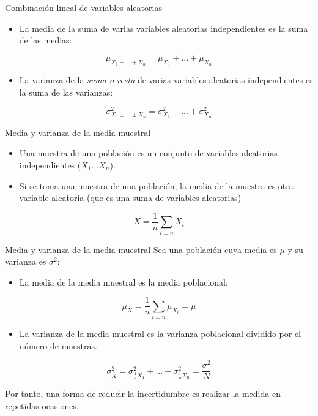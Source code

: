 \documentclass[aspectratio=169, usenames,svgnames,dvipsnames]{beamer}
\begin{document}
\begin{frame}[label={sec:org675d2d7}]{Combinación lineal de variables aleatorias}
\begin{itemize}
\item La \alert{media de la suma} de varias variables aleatorias \alert{independientes} es
la suma de las medias:
\end{itemize}
\[
\mu_{X_{1}+...+X_{n}}=\mu_{X_{1}}+...+\mu_{X_{n}}
\]

\begin{itemize}
\item La \alert{varianza de la \emph{suma o resta}} de varias variables aleatorias
\alert{independientes} es la \alert{suma} de las varianzas:
\end{itemize}

\[
\sigma_{X_{1}\pm...\pm X_{n}}^{2}=\sigma_{X_{1}}^{2}+...+\sigma_{X_{n}}^{2}
\]
\end{frame}



\begin{frame}[label={sec:orge604e07}]{Media y varianza de la media muestral}
\begin{itemize}
\item Una \alert{muestra de una población} es un conjunto de variables
aleatorias independientes (\(X_{1}...X_{n}\)).

\item Si se toma una muestra de una población, la media de la muestra es otra
variable aleatoria (que es una suma de variables aleatorias)
\end{itemize}

\[
\overline{X}=\frac{1}{n}\sum_{i=n}X_{i}
\]
\end{frame}



\begin{frame}[label={sec:orgb79179c}]{Media y varianza de la media muestral}
Sea una población cuya media es \(\mu\) y su varianza es \(\sigma^{2}\):

\begin{itemize}
\item La \alert{media de la media muestral} es la media poblacional:
\end{itemize}
\[
\mu_{\overline{X}}=\frac{1}{n}\sum_{i = n}\mu_{X_{i}} = \mu
\]

\begin{itemize}
\item La \alert{varianza de la media muestral} es la varianza poblacional dividido por el número de muestras.
\end{itemize}

\[
\sigma_{\overline{X}}^{2}=\sigma_{\frac{1}{n}X_{1}}^{2}+...+\sigma_{\frac{1}{n}X_{n}}^{2}=\frac{\sigma^2}{N}
\]

\begin{block}{}
Por tanto, una forma de \alert{reducir la incertidumbre} es realizar la
\alert{medida en repetidas ocasiones}.
\end{block}
\end{frame}
\end{document}
